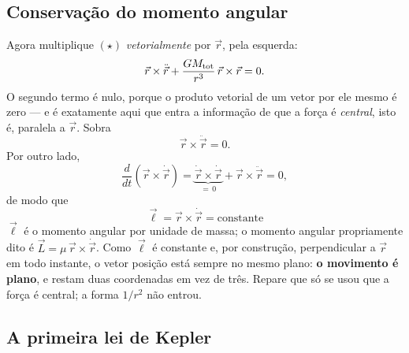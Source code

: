 \documentclass[11pt,a4paper]{article}
\begin{document}
\subsection*{Conservação do momento angular}

Agora multiplique $(\star)$ \emph{vetorialmente} por $\vec{r}$, pela esquerda:
\[
\vec{r}\times\ddot{\vec{r}}+\frac{GM_{\rm tot}}{r^{3}}\,\vec{r}\times\vec{r}=0.
\]
O segundo termo é nulo, porque o produto vetorial de um vetor por ele mesmo é zero --- e é exatamente aqui que
entra a informação de que a força é \emph{central}, isto é, paralela a $\vec{r}$. Sobra
\[
\vec{r}\times\ddot{\vec{r}}=0.
\]
Por outro lado,
\[
\frac{d}{dt}\left(\vec{r}\times\dot{\vec{r}}\right)
=\underbrace{\dot{\vec{r}}\times\dot{\vec{r}}}_{=\,0}+\vec{r}\times\ddot{\vec{r}}=0,
\]
de modo que
\[
\boxed{\ \vec{\ell}=\vec{r}\times\dot{\vec{r}}=\text{constante}\ }
\]
$\vec{\ell}$ é o momento angular por unidade de massa; o momento angular propriamente dito é
$\vec{L}=\mu\,\vec{r}\times\dot{\vec{r}}$. Como $\vec{\ell}$ é constante e, por construção, perpendicular a
$\vec{r}$ em todo instante, o vetor posição está sempre no mesmo plano: \textbf{o movimento é plano}, e restam
duas coordenadas em vez de três. Repare que só se usou que a força é central; a forma $1/r^{2}$ não entrou.

\subsection*{A primeira lei de Kepler}
\end{document}
